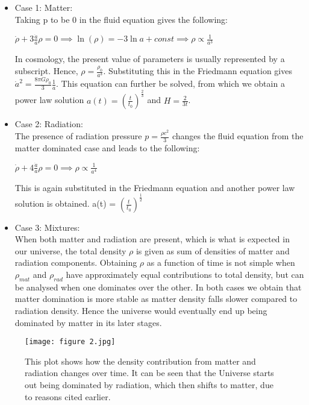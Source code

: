 \begin{itemize}
    \item Case 1: Matter: \\
    Taking p to be 0 in the fluid equation gives the following:
    \begin{center}
    \begin{math}
         \dot{\rho} + 3\frac{\dot{a}}{a}{\rho} = 0 \implies \ln(\rho) = -3\ln{a} + const \implies \rho \propto \frac{1}{a^3}
    \end{math}
    \end{center}
    In cosmology, the present value of parameters is usually represented by a subscript. Hence, 
    ${\rho}=\frac{{\rho}_0}{a^3}$. Substituting this in the Friedmann equation gives ${\dot{a}^2} = \frac{8{\pi}G{\rho_{0}}}{3}\frac{1}{a}$.
    This equation can further be solved, from which we obtain a power law solution $a(t)=(\frac{t}{t_0})^{\frac{2}{3}}$ and $H=\frac{2}{3t}$.
    \item Case 2: Radiation: \\
    The presence of radiation pressure $p = \frac{{\rho}c^2}{3}$ changes the fluid equation from the matter dominated case and leads to the following:
    \begin{center}
    \begin{math}
         \dot{\rho} + 4\frac{\dot{a}}{a}{\rho}=0 \implies \rho \propto \frac{1}{a^4}
    \end{math}
    \end{center}
    This is again substituted in the Friedmann equation and another power law solution is obtained. a(t) = $(\frac{t}{t_0})^{\frac{1}{2}}$
    \item Case 3: Mixtures: \\
    When both matter and radiation are present, which is what is expected in our universe, the total density $\rho$ is given as sum of densities of matter and radiation components. Obtaining $\rho$ as a function of time is not simple when $\rho_{mat}$ and $\rho_{rad}$ have approximately equal contributions to total density, but can be analysed when one dominates over the other. In both cases we obtain that matter domination is more stable as matter density falls slower compared to radiation density. Hence the universe would eventually end up being dominated by matter in its later stages.
\end{itemize}

\begin{figure}[H]
    \centering
    \texttt{[image: figure 2.jpg]}
    \caption{This plot shows how the density contribution from matter and radiation changes over time. It can be seen that the Universe starts out being dominated by radiation, which then shifts to matter, due to reasons cited earlier.}
    \label{fig:geometry}
\end{figure}

